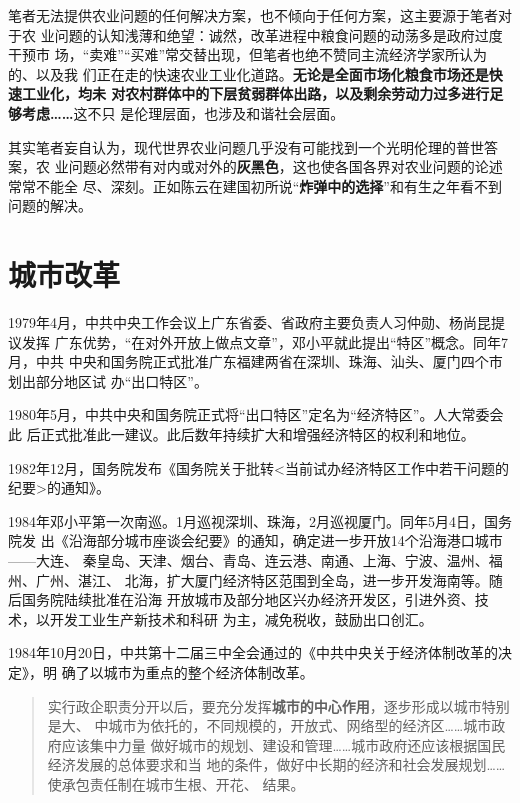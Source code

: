 笔者无法提供农业问题的任何解决方案，也不倾向于任何方案，这主要源于笔者对于农
业问题的认知浅薄和绝望：诚然，改革进程中粮食问题的动荡多是政府过度干预市
场，“卖难”“买难”常交替出现，但笔者也绝不赞同主流经济学家所认为的、以及我
们正在走的快速农业工业化道路。\textbf{无论是全面市场化粮食市场还是快速工业化，均未
  对农村群体中的下层贫弱群体出路，以及剩余劳动力过多进行足够考虑……}这不只
是伦理层面，也涉及和谐社会层面。

其实笔者妄自认为，现代世界农业问题几乎没有可能找到一个光明伦理的普世答案，农
业问题必然带有对内或对外的\textbf{灰黑色}，这也使各国各界对农业问题的论述常常不能全
尽、深刻。正如陈云在建国初所说“\textbf{炸弹中的选择}”和有生之年看不到问题的解决。



\section{城市改革}

1979年4月，中共中央工作会议上广东省委、省政府主要负责人习仲勋、杨尚昆提议发挥
广东优势，“在对外开放上做点文章”，邓小平就此提出“特区”概念。同年7月，中共
中央和国务院正式批准广东福建两省在深圳、珠海、汕头、厦门四个市划出部分地区试
办“出口特区”。

1980年5月，中共中央和国务院正式将“出口特区”定名为“经济特区”。人大常委会此
后正式批准此一建议。此后数年持续扩大和增强经济特区的权利和地位。

1982年12月，国务院发布《国务院关于批转<当前试办经济特区工作中若干问题的
纪要>的通知》。

1984年邓小平第一次南巡。1月巡视深圳、珠海，2月巡视厦门。同年5月4日，国务院发
出《沿海部分城市座谈会纪要》的通知，确定进一步开放14个沿海港口城市——大连、
秦皇岛、天津、烟台、青岛、连云港、南通、上海、宁波、温州、福州、广州、湛江、
北海，扩大厦门经济特区范围到全岛，进一步开发海南等。随后国务院陆续批准在沿海
开放城市及部分地区兴办经济开发区，引进外资、技术，以开发工业生产新技术和科研
为主，减免税收，鼓励出口创汇。


1984年10月20日，中共第十二届三中全会通过的《中共中央关于经济体制改革的决定》，明
确了以城市为重点的整个经济体制改革。
\begin{quotation}
  实行政企职责分开以后，要充分发挥\textbf{城市的中心作用}，逐步形成以城市特别是大、
  中城市为依托的，不同规模的，开放式、网络型的经济区……城市政府应该集中力量
  做好城市的规划、建设和管理……城市政府还应该根据国民经济发展的总体要求和当
  地的条件，做好中长期的经济和社会发展规划……使承包责任制在城市生根、开花、
  结果。
\end{quotation}

